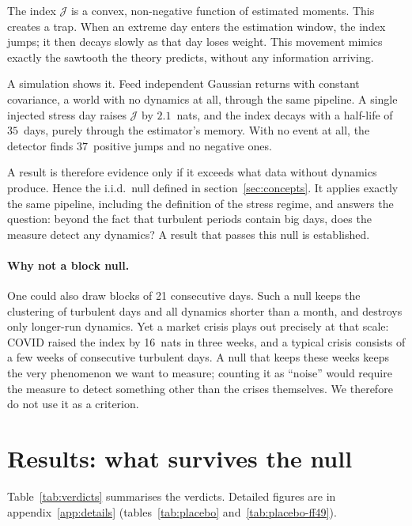 \documentclass[11pt]{article}
\theoremstyle{definition}
\newcommand{\JJ}{\mathcal{J}}
\begin{document}
The index $\JJ$ is a convex, non-negative function of estimated moments. This
creates a trap. When an extreme day enters the estimation window, the index
jumps; it then decays slowly as that day loses weight. This movement mimics
exactly the sawtooth the theory predicts, without any information arriving.

A simulation shows it. Feed independent Gaussian returns with constant
covariance, a world with no dynamics at all, through the same pipeline. A
single injected stress day raises $\JJ$ by $2.1$~nats, and the index decays
with a half-life of $35$~days, purely through the estimator's memory. With no
event at all, the detector finds $37$~positive jumps and no negative ones.

A result is therefore evidence only if it exceeds what data without dynamics
produce. Hence the i.i.d.\ null defined in section~\ref{sec:concepts}. It
applies exactly the same pipeline, including the definition of the stress
regime, and answers the question: beyond the fact that turbulent periods
contain big days, does the measure detect any dynamics? A result that passes
this null is established.

\paragraph{Why not a block null.} One could also draw blocks of 21
consecutive days. Such a null keeps the clustering of turbulent days and all
dynamics shorter than a month, and destroys only longer-run dynamics. Yet a
market crisis plays out precisely at that scale: COVID raised the index by
16~nats in three weeks, and a typical crisis consists of a few weeks of
consecutive turbulent days. A null that keeps these weeks keeps the very
phenomenon we want to measure; counting it as ``noise'' would require the
measure to detect something other than the crises themselves. We therefore do
not use it as a criterion.

\section{Results: what survives the null}
\label{sec:resultats}

Table~\ref{tab:verdicts} summarises the verdicts. Detailed figures are in
appendix~\ref{app:details} (tables~\ref{tab:placebo}
and~\ref{tab:placebo-ff49}).
\end{document}
